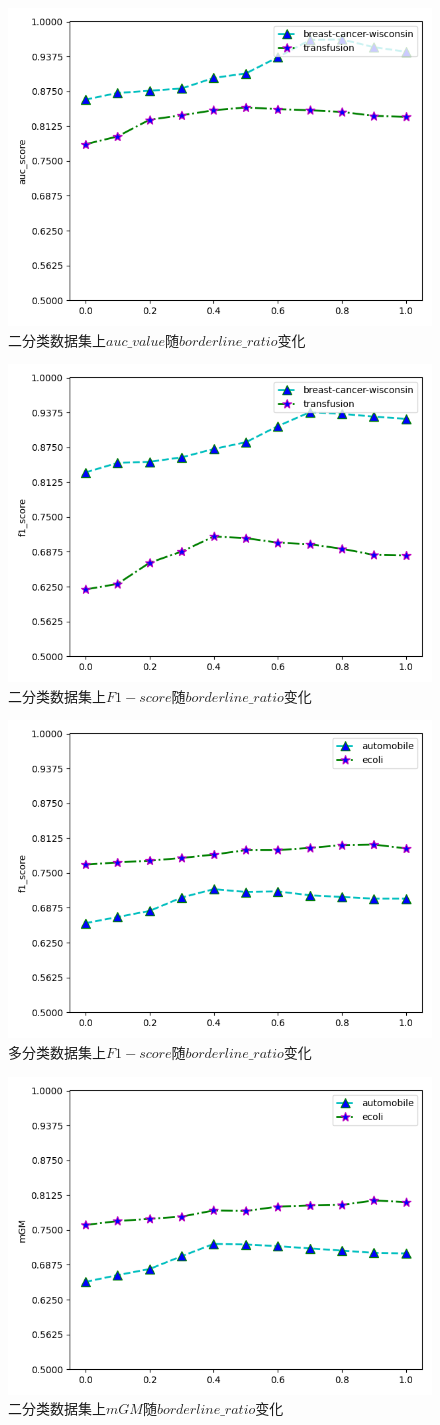 \documentclass{article}
\begin{document}
\begin{figure}
  \centering
  \includegraphics[width=.4\textwidth]{transfusion_breast_auc.png}
  \caption{二分类数据集上$auc\_value$随$borderline\_ratio$变化}
  \label{fig9}
\end{figure}
\begin{figure}
  \centering
  \includegraphics[width=.4\textwidth]{transfusion_breast_f1.png}
  \caption{二分类数据集上$F1-score$随$borderline\_ratio$变化}
  \label{fig10}
\end{figure}
\begin{figure}
  \centering
  \includegraphics[width=.4\textwidth]{automobile_ecoli_f1.png}
  \caption{多分类数据集上$F1-score$随$borderline\_ratio$变化}
  \label{fig11}
\end{figure}
\begin{figure}
  \centering
  \includegraphics[width=.4\textwidth]{automobile_ecoli_mGM.png}
  \caption{二分类数据集上$mGM$随$borderline\_ratio$变化}
  \label{fig12}
\end{figure}
\end{document}
